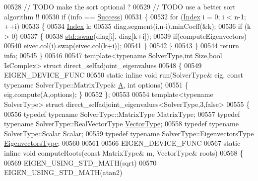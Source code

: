 \begin{DoxyCode}
00528   \textcolor{comment}{// TODO make the sort optional ?}
00529   \textcolor{comment}{// TODO use a better sort algorithm !!}
00530   \textcolor{keywordflow}{if} (info == \hyperlink{group__enums_gga85fad7b87587764e5cf6b513a9e0ee5ea52581b035f4b59c203b8ff999ef5fcea}{Success})
00531   \{
00532     \textcolor{keywordflow}{for} (\hyperlink{group___eigenvalues___module_a8a59ab7734b6eae2754fd78bc7c3a360}{Index} i = 0; i < n-1; ++i)
00533     \{
00534       \hyperlink{group___eigenvalues___module_a8a59ab7734b6eae2754fd78bc7c3a360}{Index} k;
00535       diag.segment(i,n-i).minCoeff(&k);
00536       \textcolor{keywordflow}{if} (k > 0)
00537       \{
00538         \hyperlink{endian_8c_a3ca5ecd34b04d6a243c054ac3a57f68d}{std::swap}(diag[i], diag[k+i]);
00539         \textcolor{keywordflow}{if}(computeEigenvectors)
00540           eivec.col(i).swap(eivec.col(k+i));
00541       \}
00542     \}
00543   \}
00544   \textcolor{keywordflow}{return} info;
00545 \}
00546   
00547 \textcolor{keyword}{template}<\textcolor{keyword}{typename} SolverType,\textcolor{keywordtype}{int} Size,\textcolor{keywordtype}{bool} IsComplex> \textcolor{keyword}{struct }direct\_selfadjoint\_eigenvalues
00548 \{
00549   EIGEN\_DEVICE\_FUNC
00550   \textcolor{keyword}{static} \textcolor{keyword}{inline} \textcolor{keywordtype}{void} run(SolverType& eig, \textcolor{keyword}{const} \textcolor{keyword}{typename} SolverType::MatrixType& 
      \hyperlink{group___core___module_class_eigen_1_1_matrix}{A}, \textcolor{keywordtype}{int} options)
00551   \{ eig.compute(A,options); \}
00552 \};
00553 
00554 \textcolor{keyword}{template}<\textcolor{keyword}{typename} SolverType> \textcolor{keyword}{struct }direct\_selfadjoint\_eigenvalues<SolverType,3,false>
00555 \{
00556   \textcolor{keyword}{typedef} \textcolor{keyword}{typename} SolverType::MatrixType MatrixType;
00557   \textcolor{keyword}{typedef} \textcolor{keyword}{typename} SolverType::RealVectorType \hyperlink{struct_vector_type}{VectorType};
00558   \textcolor{keyword}{typedef} \textcolor{keyword}{typename} SolverType::Scalar \hyperlink{group___eigenvalues___module_a0bfcedf4245b6846007ca4f01e4feb1f}{Scalar};
00559   \textcolor{keyword}{typedef} \textcolor{keyword}{typename} SolverType::EigenvectorsType \hyperlink{group___core___module}{EigenvectorsType};
00560   
00561 
00566   EIGEN\_DEVICE\_FUNC
00567   \textcolor{keyword}{static} \textcolor{keyword}{inline} \textcolor{keywordtype}{void} computeRoots(\textcolor{keyword}{const} MatrixType& m, VectorType& roots)
00568   \{
00569     EIGEN\_USING\_STD\_MATH(sqrt)
00570     EIGEN\_USING\_STD\_MATH(atan2)

\end{DoxyCode}
